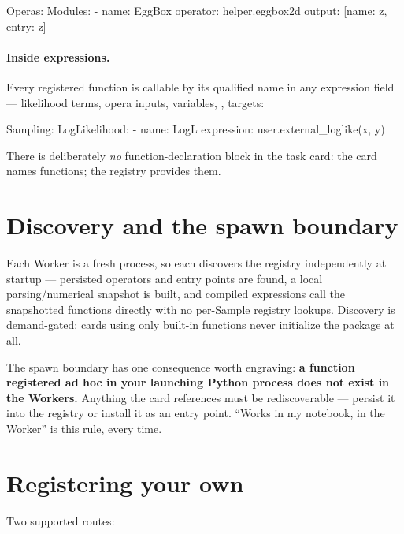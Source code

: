 \begin{yamlwin}
Operas:
  Modules:
    - name: EggBox
      operator: helper.eggbox2d
      output: [{name: z, entry: z}]
\end{yamlwin}

\paragraph{Inside expressions.} Every registered function is callable by its qualified
name in any expression field --- likelihood terms, opera inputs, 
variables, ,  targets:

\begin{yamlwin}
Sampling:
  LogLikelihood:
    - name: LogL
      expression: user.external_loglike(x, y)
\end{yamlwin}

There is deliberately \emph{no} function-declaration block in the task card: the card
names functions; the registry provides them.

\section{Discovery and the spawn boundary}
\label{sec:operas-discovery}

Each Worker is a fresh  process, so each discovers the registry
independently at startup --- persisted operators and entry points are found, a local
parsing/numerical snapshot is built, and compiled expressions call the snapshotted
functions directly with no per-Sample registry lookups. Discovery is demand-gated:
cards using only built-in functions never initialize the package at all.

\begin{jwarn}
The spawn boundary has one consequence worth engraving: \textbf{a function registered
ad hoc in your launching Python process does not exist in the Workers.} Anything the
card references must be rediscoverable --- persist it into the registry or install it
as an entry point. ``Works in my notebook,  in the Worker'' is this
rule, every time.
\end{jwarn}

\section{Registering your own}
\label{sec:operas-registering}

Two supported routes:

